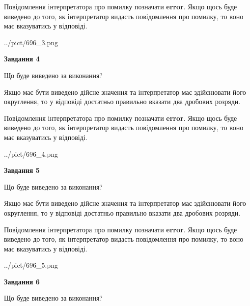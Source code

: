 \documentclass[12pt, ukrainian]{article}
\begin{document}
{\begin {Large}
Повідомлення інтерпретатора про помилку позначати \textbf{error}.
Якщо щось буде виведено до того, як інтерпретатор видасть повідомлення про помилку, 
то воно має вказуватись у відповіді. \par

\begin{center}
	{../pict/696_3.png}
\end{center}
\newpage

{\begin {center}\textbf{Завдання 4}\end {center}}\par
Що буде виведено за виконання? \par

Якщо має бути виведено дійсне значення та інтерпретатор має здійснювати його округлення, 
то у відповіді достатньо правильно вказати два дробових розряди.

Повідомлення інтерпретатора про помилку позначати \textbf{error}.
Якщо щось буде виведено до того, як інтерпретатор видасть повідомлення про помилку, 
то воно має вказуватись у відповіді. \par

\begin{center}
	{../pict/696_4.png}
\end{center}
\newpage

{\begin {center}\textbf{Завдання 5}\end {center}}\par
Що буде виведено за виконання? \par

Якщо має бути виведено дійсне значення та інтерпретатор має здійснювати його округлення, 
то у відповіді достатньо правильно вказати два дробових розряди.

Повідомлення інтерпретатора про помилку позначати \textbf{error}.
Якщо щось буде виведено до того, як інтерпретатор видасть повідомлення про помилку, 
то воно має вказуватись у відповіді. \par

\begin{center}
	{../pict/696_5.png}
\end{center}
\newpage

{\begin {center}\textbf{Завдання 6}\end {center}}\par
Що буде виведено за виконання? \par


\end{Large}}
\end{document}
